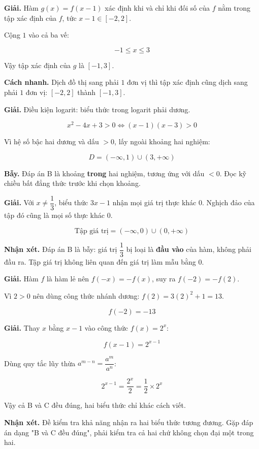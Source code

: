 \documentclass[11pt, a4paper]{article}
\begin{document}
\begin{dapan}[7 — Đáp án C]
\textbf{Giải.} Hàm $g(x) = f(x-1)$ xác định khi và chỉ khi đối số của $f$ nằm trong tập xác định của $f$, tức $x - 1 \in [-2, 2]$.

Cộng $1$ vào cả ba vế:

$$-1 \le x \le 3$$

Vậy tập xác định của $g$ là $[-1, 3]$.

\textbf{Cách nhanh.} Dịch đồ thị sang phải $1$ đơn vị thì tập xác định cũng dịch sang phải $1$ đơn vị: $[-2,2]$ thành $[-1,3]$.
\end{dapan}

\begin{dapan}[8 — Đáp án A]
\textbf{Giải.} Điều kiện logarit: biểu thức trong logarit phải dương.

$$x^2 - 4x + 3 > 0 \iff (x-1)(x-3) > 0$$

Vì hệ số bậc hai dương và dấu $> 0$, lấy ngoài khoảng hai nghiệm:

$$D = (-\infty, 1) \cup (3, +\infty)$$

\textbf{Bẫy.} Đáp án B là khoảng \textbf{trong} hai nghiệm, tương ứng với dấu $< 0$. Đọc kỹ chiều bất đẳng thức trước khi chọn khoảng.
\end{dapan}

\begin{dapan}[9 — Đáp án C]
\textbf{Giải.} Với $x \neq \dfrac{1}{3}$, biểu thức $3x - 1$ nhận mọi giá trị thực khác $0$. Nghịch đảo của tập đó cũng là mọi số thực khác $0$.

$$\text{Tập giá trị} = (-\infty, 0) \cup (0, +\infty)$$

\textbf{Nhận xét.} Đáp án B là bẫy: giá trị $\dfrac{1}{3}$ bị loại là \textbf{đầu vào} của hàm, không phải đầu ra. Tập giá trị không liên quan đến giá trị làm mẫu bằng $0$.
\end{dapan}

\begin{dapan}[10 — Đáp án B]
\textbf{Giải.} Hàm $f$ là hàm lẻ nên $f(-x) = -f(x)$, suy ra $f(-2) = -f(2)$.

Vì $2 > 0$ nên dùng công thức nhánh dương: $f(2) = 3(2)^2 + 1 = 13$.

$$f(-2) = -13$$
\end{dapan}

\begin{dapan}[11 — Đáp án D]
\textbf{Giải.} Thay $x$ bằng $x - 1$ vào công thức $f(x) = 2^x$:

$$f(x-1) = 2^{x-1}$$

Dùng quy tắc lũy thừa $a^{m-n} = \dfrac{a^m}{a^n}$:

$$2^{x-1} = \frac{2^x}{2} = \frac{1}{2} \times 2^x$$

Vậy cả B và C đều đúng, hai biểu thức chỉ khác cách viết.

\textbf{Nhận xét.} Đề kiểm tra khả năng nhận ra hai biểu thức tương đương. Gặp đáp án dạng "B và C đều đúng", phải kiểm tra cả hai chứ không chọn đại một trong hai.
\end{dapan}
\end{document}
